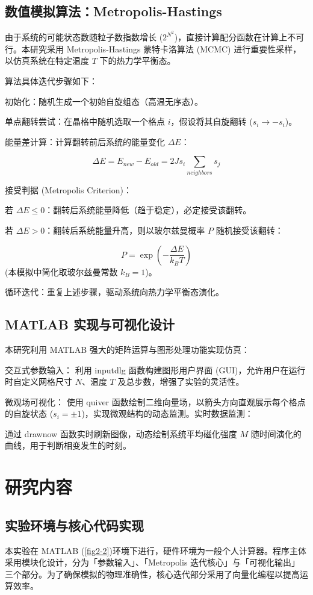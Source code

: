 \documentclass[supercite]{Experimental_Report}
\theoremstyle{definition}
\begin{document}
	\subsection{数值模拟算法：Metropolis-Hastings}
	由于系统的可能状态数随粒子数指数增长 ($2^{N^2}$)，直接计算配分函数在计算上不可行。本研究采用 Metropolis-Hastings 蒙特卡洛算法 (MCMC) 进行重要性采样，以仿真系统在特定温度 $T$ 下的热力学平衡态。
	
	算法具体迭代步骤如下：
	
	初始化：随机生成一个初始自旋组态（高温无序态）。
	
	单点翻转尝试：在晶格中随机选取一个格点 $i$，假设将其自旋翻转 ($s_i \to -s_i$)。
	
	能量差计算：计算翻转前后系统的能量变化 $\Delta E$：
	
	$$\Delta E = E_{new} - E_{old} = 2 J s_i \sum_{neighbors} s_j$$
	
	接受判据 (Metropolis Criterion)：
	
	若 $\Delta E \le 0$：翻转后系统能量降低（趋于稳定），必定接受该翻转。
	
	若 $\Delta E > 0$：翻转后系统能量升高，则以玻尔兹曼概率 $P$ 随机接受该翻转：
	
	$$P = \exp\left(-\frac{\Delta E}{k_B T}\right)$$(本模拟中简化取玻尔兹曼常数 $k_B=1$)。
	
	循环迭代：重复上述步骤，驱动系统向热力学平衡态演化。
	
	\subsection{MATLAB 实现与可视化设计}
	本研究利用 MATLAB 强大的矩阵运算与图形处理功能实现仿真：
	
	交互式参数输入： 利用 inputdlg 函数构建图形用户界面 (GUI)，允许用户在运行时自定义网格尺寸 $N$、温度 $T$ 及总步数，增强了实验的灵活性。
	
	微观场可视化： 使用 quiver 函数绘制二维向量场，以箭头方向直观展示每个格点的自旋状态 ($s_i = \pm 1$)，实现微观结构的动态监测。实时数据监测： 
	
	通过 drawnow 函数实时刷新图像，动态绘制系统平均磁化强度 $M$ 随时间演化的曲线，用于判断相变发生的时刻。
	
	\section{研究内容}
	\subsection{实验环境与核心代码实现}
	本实验在 MATLAB (\ref{fig2-2})环境下进行，硬件环境为一般个人计算器。程序主体采用模块化设计，分为「参数输入」、「Metropolis 迭代核心」与「可视化输出」三个部分。为了确保模拟的物理准确性，核心迭代部分采用了向量化编程以提高运算效率。
	
\end{document}
